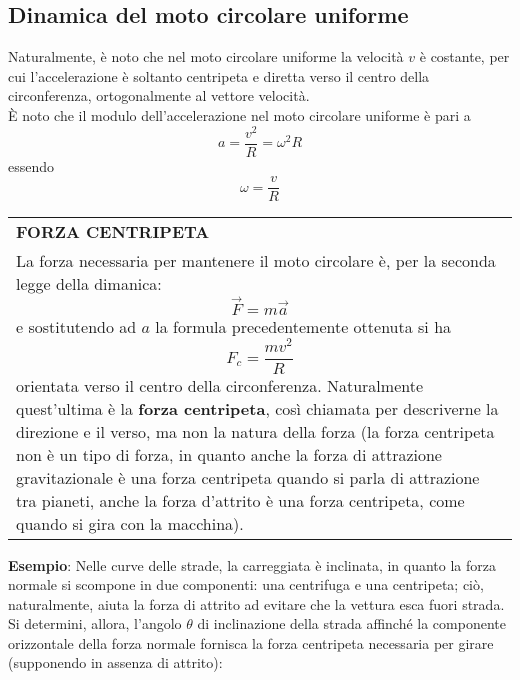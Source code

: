 \documentclass[a4paper]{extarticle}
\renewcommand\arraystretch{}
\begin{document}
\vspace{1em}
\subsection{Dinamica del moto circolare uniforme}
Naturalmente, è noto che nel moto circolare uniforme la velocità $v$ è costante, per cui l'accelerazione è soltanto centripeta e diretta verso il centro della circonferenza, ortogonalmente al vettore velocità.\\
È noto che il modulo dell'accelerazione nel moto circolare uniforme è pari a
\[a = \frac{v^2}{R} = \omega^2 R\]
essendo
\[\omega = \frac{v}{R}\]

\vspace{1em}
\setlength{\tabcolsep}{14pt}
\renewcommand{\arraystretch}{2}
\noindent
\begin{tabularx}{\textwidth}{@{}|P|@{}}
    \hline
    {\textbf{FORZA CENTRIPETA}}\\
    \parbox{\linewidth}{La forza necessaria per mantenere il moto circolare è, per la seconda legge della dimanica:
    \[\vec{F} = m \vec{a}\]
    e sostitutendo ad $a$ la formula precedentemente ottenuta si ha
    \[\boxed{F_c = \frac{m v^2}{R}}\]
    orientata verso il centro della circonferenza. Naturalmente quest'ultima è la \textbf{forza centripeta}, così chiamata per descriverne la direzione e il verso, ma non la natura della forza (la forza centripeta non è un tipo di forza, in quanto anche la forza di attrazione gravitazionale è una forza centripeta quando si parla di attrazione tra pianeti, anche la forza d'attrito è una forza centripeta, come quando si gira con la macchina).\vspace{3mm}}\\
    \hline
\end{tabularx}

\vspace{2em}
\noindent
\textbf{Esempio}: Nelle curve delle strade, la carreggiata è inclinata, in quanto la forza normale si scompone in due componenti: una centrifuga e una centripeta; ciò, naturalmente, aiuta la forza di attrito ad evitare che la vettura esca fuori strada.\\
Si determini, allora, l'angolo $\theta$ di inclinazione della strada affinché la componente orizzontale della forza normale fornisca la forza centripeta necessaria per girare (supponendo in assenza di attrito):
\end{document}

